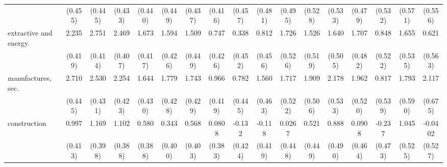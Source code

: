 {\begin{tabular}{l*{16}{c}}
                    &     (0.455)         &     (0.445)         &     (0.433)         &     (0.440)         &     (0.449)         &     (0.437)         &     (0.416)         &     (0.457)         &     (0.481)         &     (0.495)         &     (0.528)         &     (0.533)         &     (0.479)         &     (0.532)         &     (0.571)         &     (0.556)         \\
[1em]
extractive and energy.&       2.235\sym{***}&       2.751\sym{***}&       2.469\sym{***}&       1.673\sym{***}&       1.594\sym{***}&       1.509\sym{***}&       0.747         &       0.338         &       0.812         &       1.726\sym{**} &       1.526\sym{**} &       1.640\sym{**} &       1.707\sym{***}&       0.848         &       1.655\sym{**} &       0.621         \\
                    &     (0.419)         &     (0.414)         &     (0.407)         &     (0.417)         &     (0.426)         &     (0.449)         &     (0.426)         &     (0.452)         &     (0.456)         &     (0.526)         &     (0.519)         &     (0.505)         &     (0.482)         &     (0.522)         &     (0.535)         &     (0.563)         \\
[1em]
manufactures, sec.  &       2.710\sym{***}&       2.530\sym{***}&       2.254\sym{***}&       1.644\sym{***}&       1.779\sym{***}&       1.743\sym{***}&       0.966\sym{*}  &       0.782         &       1.560\sym{***}&       1.717\sym{**} &       1.909\sym{***}&       2.178\sym{***}&       1.962\sym{***}&       0.817         &       1.793\sym{**} &       2.117\sym{**} \\
                    &     (0.445)         &     (0.431)         &     (0.423)         &     (0.430)         &     (0.428)         &     (0.429)         &     (0.419)         &     (0.445)         &     (0.463)         &     (0.522)         &     (0.506)         &     (0.533)         &     (0.520)         &     (0.539)         &     (0.590)         &     (0.675)         \\
[1em]
construction        &       0.997\sym{*}  &       1.169\sym{**} &       1.102\sym{**} &       0.580         &       0.343         &       0.568         &      0.0808         &      -0.132         &      -0.118         &      0.0267         &       0.521         &       0.888         &      0.0908         &      -0.237         &       1.045\sym{*}  &     -0.0402         \\
                    &     (0.413)         &     (0.398)         &     (0.388)         &     (0.388)         &     (0.400)         &     (0.403)         &     (0.383)         &     (0.424)         &     (0.419)         &     (0.448)         &     (0.449)         &     (0.490)         &     (0.464)         &     (0.473)         &     (0.525)         &     (0.527)         \\

\end{tabular}}
